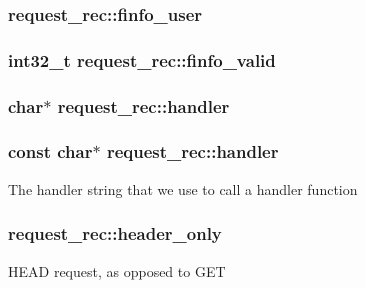 \subsubsection[{\texorpdfstring{finfo\+\_\+user}{finfo_user}}]{ request\+\_\+rec\+::finfo\+\_\+user}\hypertarget{structrequest__rec_a1c4ff079778ece80f08018b12e1409bc}{}\label{structrequest__rec_a1c4ff079778ece80f08018b12e1409bc}
\subsubsection[{\texorpdfstring{finfo\+\_\+valid}{finfo_valid}}]{\setlength{\rightskip}{0pt plus 5cm}int32\+\_\+t request\+\_\+rec\+::finfo\+\_\+valid}\hypertarget{structrequest__rec_a27f04ee425af97604764a90f21ff1e1e}{}\label{structrequest__rec_a27f04ee425af97604764a90f21ff1e1e}
\subsubsection[{\texorpdfstring{handler}{handler}}]{\setlength{\rightskip}{0pt plus 5cm}char$\ast$ request\+\_\+rec\+::handler}\hypertarget{structrequest__rec_a5c5e286cfc2fd30860c1efcef7724516}{}\label{structrequest__rec_a5c5e286cfc2fd30860c1efcef7724516}
\subsubsection[{\texorpdfstring{handler}{handler}}]{\setlength{\rightskip}{0pt plus 5cm}const char$\ast$ request\+\_\+rec\+::handler}\hypertarget{structrequest__rec_a4fb5cec8fe63f73648e96a3af0dff91c}{}\label{structrequest__rec_a4fb5cec8fe63f73648e96a3af0dff91c}
The handler string that we use to call a handler function 
\subsubsection[{\texorpdfstring{header\+\_\+only}{header_only}}]{ request\+\_\+rec\+::header\+\_\+only}\hypertarget{structrequest__rec_a3eaeb9ca893c14921b8bf98e3d9b4a11}{}\label{structrequest__rec_a3eaeb9ca893c14921b8bf98e3d9b4a11}
H\+E\+AD request, as opposed to G\+ET 
